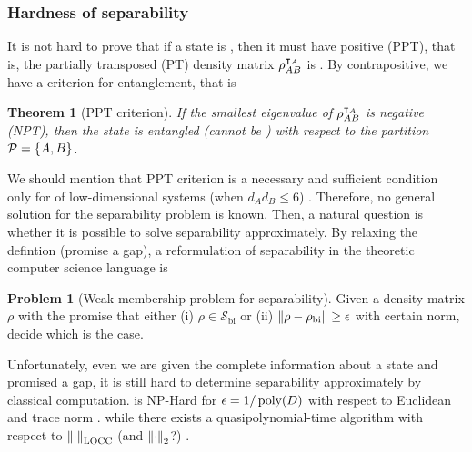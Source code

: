 \documentclass[
aps,
pra,
twocolumn,
floatfix,
]{revtex4-2}
\theoremstyle{plain}
\newtheorem{theorem}{Theorem}
\theoremstyle{definition}
\newtheorem{problem}{Problem}
\newcommand{\dm}{\rho}
\newcommand{\bi}{\text{bi}}
\newcommand{\ppt}{\textup{PPT}}
\newcommand{\locc}{\textup{LOCC}}
\newcommand{\separable}{\mathcal{S}}
\newcommand{\ppartition}{\mathcal{P}}
\begin{document}
\subsubsection{Hardness of separability}
It is not hard to prove that if a state is , then it must have positive  (PPT), 
that is, the partially transposed (PT) density matrix $\dm_{AB}^{\T_A}$ is  \cite{peresSeparabilityCriterionDensity1996}.
By contrapositive, we have a criterion for entanglement, that is
\begin{theorem}[PPT criterion]\label{thm:ppt}
	If the smallest eigenvalue of  $\dm_{AB}^{\T_A}$ is negative (NPT), then the state is entangled (cannot be ) with respect to the partition $\ppartition=\qty{A,B}$.
\end{theorem}
We should mention that PPT criterion is a necessary and sufficient condition only for  of low-dimensional systems 
(when $d_A d_B \le 6$) \cite{horodeckiSeparabilityMixedStates1996}.
Therefore, no general solution for the separability problem is known.
Then, a natural question is whether it is possible to solve separability approximately.
By relaxing the defintion (promise a gap), a reformulation of separability in the theoretic computer science language is
\begin{problem}[Weak membership problem for separability]\label{prm:weak_membership problem_for_separability}
	Given a density matrix $\dm$ with the promise that either (i) $\dm\in \separable_{\bi}$ or (ii) $\norm{\dm-\dm_{\bi}}\ge \epsilon$ with certain norm, decide which is the case.
\end{problem}
Unfortunately, even we are given the complete information about a state and promised a gap, it is still hard to determine separability approximately by classical computation.
 is NP-Hard for $\epsilon=1/\operatorname{\textup{poly}}(D)$ with respect to Euclidean  and trace norm \cite{gurvitsClassicalDeterministicComplexity2003}.
\cite{ioannouComputationalComplexityQuantum2007}
\cite{dohertyCompleteFamilySeparability2004}
while there exists a quasipolynomial-time algorithm with respect to $\norm{\cdot}_{\locc}$ (and $\norm{\cdot}_2$?) \cite{brandaoQuasipolynomialtimeAlgorithmQuantum2011}.
\end{document}
